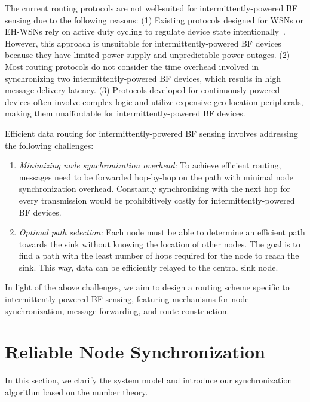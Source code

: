 \documentclass[lettersize,journal]{IEEEtran}
\begin{document}
The current routing protocols are not well-suited for intermittently-powered BF sensing due to the following reasons: (1) Existing protocols designed for WSNs or EH-WSNs rely on active duty cycling to regulate device state intentionally~\cite{2012-csur-wsn, 2018-tsn-ehwsn}. However, this approach is unsuitable for intermittently-powered BF devices because they have limited power supply and unpredictable power outages. (2) Most routing protocols do not consider the time overhead involved in synchronizing two intermittently-powered BF devices, which results in high message delivery latency. (3) Protocols developed for continuously-powered devices often involve complex logic and utilize expensive geo-location peripherals, making them unaffordable for intermittently-powered BF devices. 

Efficient data routing for intermittently-powered BF sensing involves addressing the following challenges:
\begin{enumerate}
    \item \emph{Minimizing node synchronization overhead:} To achieve efficient routing, messages need to be forwarded hop-by-hop on the path with minimal node synchronization overhead. Constantly synchronizing with the next hop for every transmission would be prohibitively costly for intermittently-powered BF devices.
    \item \emph{Optimal path selection:} Each node must be able to determine an efficient path towards the sink without knowing the location of other nodes. The goal is to find a path with the least number of hops required for the node to reach the sink. This way, data can be efficiently relayed to the central sink node.
\end{enumerate}

In light of the above challenges, we aim to design a routing scheme specific to intermittently-powered BF sensing, featuring mechanisms for node synchronization, message forwarding, and route construction.




\section{Reliable Node Synchronization}
\label{sec:sync}
In this section, we clarify the system model and introduce our synchronization algorithm based on the number theory.
\end{document}
